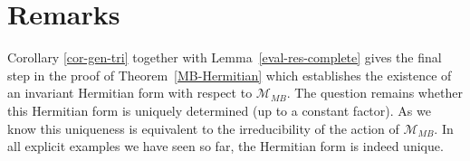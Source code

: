 \documentclass[pdftex]{sigma}
\numberwithin{equation}{section}
\begin{document}
\section{Remarks}
\begin{Remark}
Corollary \ref{cor-gen-tri} together with Lemma~\ref{eval-res-complete} gives the final step in the proof of Theo\-rem~\ref{MB-Hermitian}
which establishes the existence of an invariant Hermitian form with respect to
$\mathcal{M}_{MB}$. The question remains whether this Hermitian form is uniquely
determined (up to a constant factor). As we know this uniqueness is equivalent to
the irreducibility of the action of $\mathcal{M}_{MB}$. In all explicit examples we
have seen so far, the Hermitian form is indeed unique.
\end{Remark}
\end{document}
